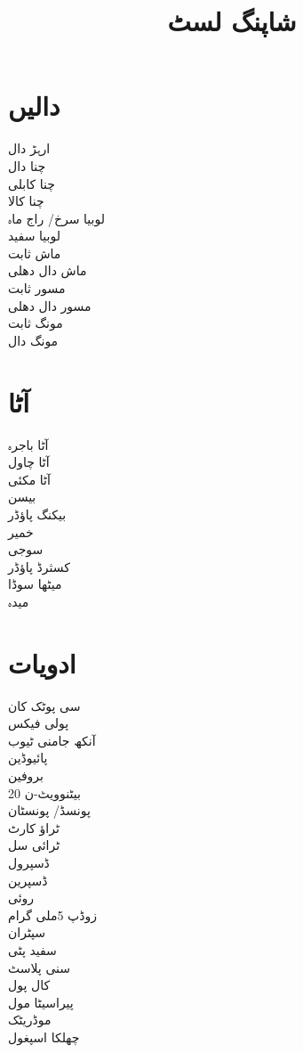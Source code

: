 \documentclass[a4paper,11pt]{article}
\title{ \vspace{-3cm} شاپنگ لسٹ}
\date{}
\author{}
\begin{document}
 
\maketitle
 \vspace{-2cm}
 \begin{multicols}{6}
\section*{دالیں}
ارہڑ دال \\
چنا دال \\
چنا کابلی \\
چنا کالا \\
لوبیا سرخ/ راج ماہ \\
لوبیا سفید \\
ماش ثابت \\
ماش دال دھلی \\
مسور ثابت \\
مسور دال دھلی \\
مونگ ثابت \\
مونگ دال
\section*{آٹا}
آٹا باجرہ \\
آٹا چاول \\
آٹا مکئی \\
بیسن \\
بیکنگ پاؤڈر \\
خمیر \\
سوجی \\
کسثرڈ پاؤڈر \\
میٹھا سوڈا \\
میدہ
\section*{ادویات}
سی پوٹک کان \\
پولی فیکس  \\
آنکھ جامنی ٹیوب  \\
پائیوڈین \\
بروفین \\
بیٹنوویٹ-ن 20 \\
پونسڈ/ پونسٹان \\
ٹراؤ کارٹ \\
ٹرائی سل \\
ڈسپرول \\
ڈسپرین \\
روئی \\
زوڈپ 5ملی گرام \\
سپٹران \\
سفید پٹی \\
سنی پلاسٹ \\
کال پول \\
پیراسیٹا مول \\
موڈریٹک \\
چھلکا اسپغول

\end{multicols}
\end{document}
